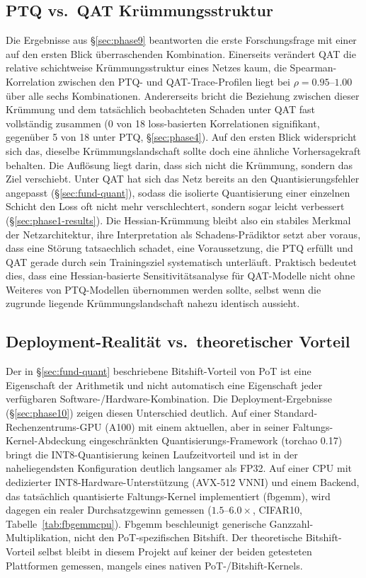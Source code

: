 \subsection{PTQ vs.\ QAT Krümmungsstruktur}
\label{sec:disc-ptqqat}

Die Ergebnisse aus \S\ref{sec:phase9} beantworten die erste Forschungsfrage mit einer auf den ersten Blick überraschenden Kombination. Einerseits verändert QAT die relative schichtweise Krümmungsstruktur eines Netzes kaum, die Spearman-Korrelation zwischen den PTQ- und QAT-Trace-Profilen liegt bei $\rho=0.95$--$1.00$ über alle sechs Kombinationen. Andererseits bricht die Beziehung zwischen dieser Krümmung und dem tatsächlich beobachteten Schaden unter QAT fast vollständig zusammen (0 von 18 loss-basierten Korrelationen signifikant, gegenüber 5 von 18 unter PTQ, \S\ref{sec:phase4}). Auf den ersten Blick widerspricht sich das, dieselbe Krümmungslandschaft sollte doch eine ähnliche Vorhersagekraft behalten. Die Auflösung liegt darin, dass sich nicht die Krümmung, sondern das Ziel verschiebt. Unter QAT hat sich das Netz bereits an den Quantisierungsfehler angepasst (\S\ref{sec:fund-quant}), sodass die isolierte Quantisierung einer einzelnen Schicht den Loss oft nicht mehr verschlechtert, sondern sogar leicht verbessert (\S\ref{sec:phase1-results}). Die Hessian-Krümmung bleibt also ein stabiles Merkmal der Netzarchitektur, ihre Interpretation als Schadens-Prädiktor setzt aber voraus, dass eine Störung tatsaechlich schadet, eine Voraussetzung, die PTQ erfüllt und QAT gerade durch sein Trainingsziel systematisch unterläuft. Praktisch bedeutet dies, dass eine Hessian-basierte Sensitivitätsanalyse für QAT-Modelle nicht ohne Weiteres von PTQ-Modellen übernommen werden sollte, selbst wenn die zugrunde liegende Krümmungslandschaft nahezu identisch aussieht.

\subsection{Deployment-Realität vs.\ theoretischer Vorteil}
\label{sec:disc-deployment}

Der in \S\ref{sec:fund-quant} beschriebene Bitshift-Vorteil von PoT ist eine Eigenschaft der Arithmetik und nicht automatisch eine Eigenschaft jeder verfügbaren Software-/Hardware-Kombination. Die Deployment-Ergebnisse (\S\ref{sec:phase10}) zeigen diesen Unterschied deutlich. Auf einer Standard-Rechenzentrums-GPU (A100) mit einem aktuellen, aber in seiner Faltungs-Kernel-Abdeckung eingeschränkten Quantisierungs-Framework (torchao 0.17) bringt die INT8-Quantisierung keinen Laufzeitvorteil und ist in der naheliegendsten Konfiguration deutlich langsamer als FP32. Auf einer CPU mit dedizierter INT8-Hardware-Unterstützung (AVX-512 VNNI) und einem Backend, das tatsächlich quantisierte Faltungs-Kernel implementiert (fbgemm), wird dagegen ein realer Durchsatzgewinn gemessen ($1.5$--$6.0\times$, CIFAR10, Tabelle~\ref{tab:fbgemmcpu}). Fbgemm beschleunigt generische Ganzzahl-Multiplikation, nicht den PoT-spezifischen Bitshift. Der theoretische Bitshift-Vorteil selbst bleibt in diesem Projekt auf keiner der beiden getesteten Plattformen gemessen, mangels eines nativen PoT-/Bitshift-Kernels.
\par\medskip

